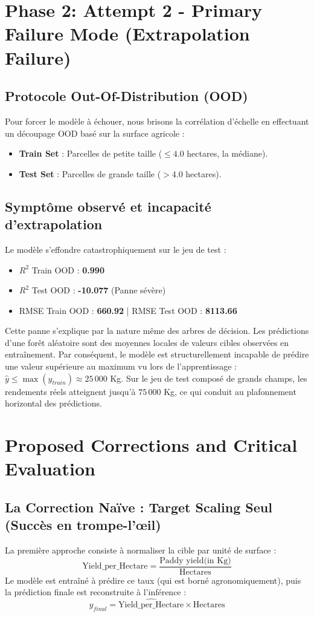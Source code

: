 \documentclass[11pt,a4paper]{article}
\begin{document}
\section{Phase 2: Attempt 2 - Primary Failure Mode (Extrapolation Failure)}

\subsection{Protocole Out-Of-Distribution (OOD)}
Pour forcer le modèle à échouer, nous brisons la corrélation d'échelle en effectuant un découpage OOD basé sur la surface agricole :
\begin{itemize}
    \item \textbf{Train Set} : Parcelles de petite taille ($\le 4.0$ hectares, la médiane).
    \item \textbf{Test Set} : Parcelles de grande taille ($> 4.0$ hectares).
\end{itemize}

\subsection{Symptôme observé et incapacité d'extrapolation}
Le modèle s'effondre catastrophiquement sur le jeu de test :
\begin{itemize}
    \item $R^2$ Train OOD : \textbf{0.990}
    \item $R^2$ Test OOD : \textbf{-10.077} (Panne sévère)
    \item RMSE Train OOD : \textbf{660.92} | RMSE Test OOD : \textbf{8113.66}
\end{itemize}

Cette panne s'explique par la nature même des arbres de décision. Les prédictions d'une forêt aléatoire sont des moyennes locales de valeurs cibles observées en entraînement. Par conséquent, le modèle est structurellement incapable de prédire une valeur supérieure au maximum vu lors de l'apprentissage : $\hat{y} \le \max(y_{train}) \approx 25\,000$ Kg. Sur le jeu de test composé de grands champs, les rendements réels atteignent jusqu'à $75\,000$ Kg, ce qui conduit au plafonnement horizontal des prédictions.

\section{Proposed Corrections and Critical Evaluation}

\subsection{La Correction Naïve : Target Scaling Seul (Succès en trompe-l'œil)}
La première approche consiste à normaliser la cible par unité de surface :
\[
\text{Yield\_per\_Hectare} = \frac{\text{Paddy yield(in Kg)}}{\text{Hectares}}
\]
Le modèle est entraîné à prédire ce taux (qui est borné agronomiquement), puis la prédiction finale est reconstruite à l'inférence :
\[
\hat{y}_{final} = \widehat{\text{Yield\_per\_Hectare}} \times \text{Hectares}
\]
\end{document}
